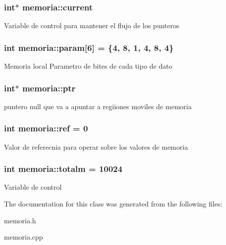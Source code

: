 \subsubsection[{\texorpdfstring{current}{current}}]{\setlength{\rightskip}{0pt plus 5cm}int$\ast$ memoria\+::current}\hypertarget{classmemoria_a6b371e842705c66e92408cdb87f58d4d}{}\label{classmemoria_a6b371e842705c66e92408cdb87f58d4d}
Variable de control para mantener el flujo de los punteros 
\subsubsection[{\texorpdfstring{param}{param}}]{\setlength{\rightskip}{0pt plus 5cm}int memoria\+::param\mbox{[}6\mbox{]} = \{4, 8, 1, 4, 8, 4\}}\hypertarget{classmemoria_ae70753ee81418cd074bac2e6b913e087}{}\label{classmemoria_ae70753ee81418cd074bac2e6b913e087}
Memoria local Parametro de bites de cada tipo de dato 
\subsubsection[{\texorpdfstring{ptr}{ptr}}]{\setlength{\rightskip}{0pt plus 5cm}int$\ast$ memoria\+::ptr}\hypertarget{classmemoria_a5884e97e572cba7209ec529bdd4957ad}{}\label{classmemoria_a5884e97e572cba7209ec529bdd4957ad}
puntero null que va a apuntar a regiiones moviles de memoria 
\subsubsection[{\texorpdfstring{ref}{ref}}]{\setlength{\rightskip}{0pt plus 5cm}int memoria\+::ref = 0}\hypertarget{classmemoria_aeec57d620ffeebd94a36e08719259f88}{}\label{classmemoria_aeec57d620ffeebd94a36e08719259f88}
Valor de referecnia para operar sobre los valores de memoria 
\subsubsection[{\texorpdfstring{totalm}{totalm}}]{\setlength{\rightskip}{0pt plus 5cm}int memoria\+::totalm = 10024}\hypertarget{classmemoria_a32399e443be444698f22a50f4747f0e9}{}\label{classmemoria_a32399e443be444698f22a50f4747f0e9}
Variable de control 

The documentation for this class was generated from the following files\+:\begin{DoxyCompactItemize}
\item 
memoria.\+h\item 
memoria.\+cpp\end{DoxyCompactItemize}
